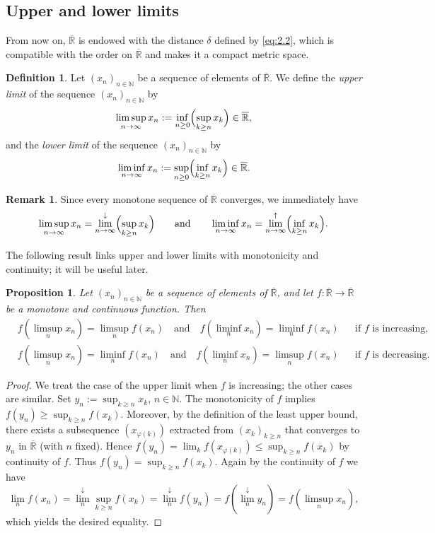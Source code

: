 \documentclass[12pt]{article}
\newtheorem{proposition}{Proposition}[section]
\theoremstyle{definition}
\newtheorem{definition}{Definition}[section]
\newtheorem{remark}{Remark}[section]
\begin{document}
\subsection{Upper and lower limits}

From now on, $\overline{\mathbb{R}}$ is endowed with the distance $\delta$ defined by \eqref{eq:2.2}, which is compatible with the order on $\overline{\mathbb{R}}$ and makes it a compact metric space.

\begin{definition}
Let $(x_n)_{n\in\mathbb{N}}$ be a sequence of elements of $\overline{\mathbb{R}}$.
We define the \emph{upper limit} of the sequence $(x_n)_{n\in\mathbb{N}}$ by
\[
\limsup_{n\to\infty} x_n:=\inf_{n\ge 0}\Bigl(\sup_{k\ge n} x_k\Bigr)\in\overline{\mathbb{R}},
\]
and the \emph{lower limit} of the sequence $(x_n)_{n\in\mathbb{N}}$ by
\[
\liminf_{n\to\infty} x_n:=\sup_{n\ge 0}\Bigl(\inf_{k\ge n} x_k\Bigr)\in\overline{\mathbb{R}}.
\]
\end{definition}

\begin{remark}
Since every monotone sequence of $\overline{\mathbb{R}}$ converges, we immediately have
\[
\limsup_{n\to\infty} x_n=\lim_{n\to\infty}^{\downarrow}\Bigl(\sup_{k\ge n} x_k\Bigr)
\qquad\text{and}\qquad
\liminf_{n\to\infty} x_n=\lim_{n\to\infty}^{\uparrow}\Bigl(\inf_{k\ge n} x_k\Bigr).
\]
\end{remark}

The following result links upper and lower limits with monotonicity and continuity; it will be useful later.

\begin{proposition}
Let $(x_n)_{n\in\mathbb{N}}$ be a sequence of elements of $\overline{\mathbb{R}}$, and let $f:\overline{\mathbb{R}}\to\overline{\mathbb{R}}$ be a monotone and continuous function.
Then
\[
\begin{aligned}
&f\!\left(\limsup_{n} x_n\right)=\limsup_{n} f(x_n)
\quad\text{and}\quad
f\!\left(\liminf_{n} x_n\right)=\liminf_{n} f(x_n)
&&\text{if $f$ is increasing,}\\
&f\!\left(\limsup_{n} x_n\right)=\liminf_{n} f(x_n)
\quad\text{and}\quad
f\!\left(\liminf_{n} x_n\right)=\limsup_{n} f(x_n)
&&\text{if $f$ is decreasing.}
\end{aligned}
\]
\end{proposition}

\begin{proof}
We treat the case of the upper limit when $f$ is increasing; the other cases are similar.
Set $y_n:=\sup_{k\ge n} x_k$, $n\in\mathbb{N}$.
The monotonicity of $f$ implies $f(y_n)\ge \sup_{k\ge n} f(x_k)$.
Moreover, by the definition of the least upper bound, there exists a subsequence $(x_{\varphi(k)})$ extracted from $(x_k)_{k\ge n}$ that converges to $y_n$ in $\overline{\mathbb{R}}$ (with $n$ fixed).
Hence $f(y_n)=\lim_{k} f(x_{\varphi(k)})\le \sup_{k\ge n} f(x_k)$ by continuity of $f$.
Thus $f(y_n)=\sup_{k\ge n} f(x_k)$.
Again by the continuity of $f$ we have
\[
\lim_{n} f(x_n)=\lim_{n}^{\downarrow}\sup_{k\ge n} f(x_k)=\lim_{n}^{\downarrow} f(y_n)=f\!\left(\lim_{n}^{\downarrow} y_n\right)=f\!\left(\limsup_{n} x_n\right),
\]
which yields the desired equality.
\end{proof}
\end{document}
